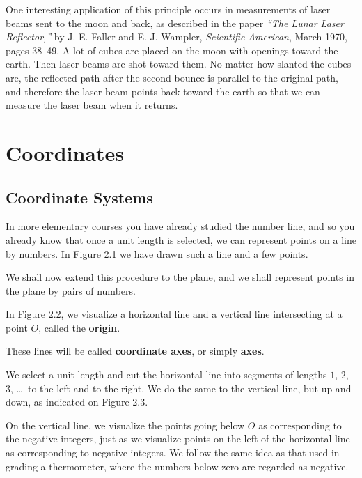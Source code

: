 \documentclass[12pt]{book} %
\begin{document}

One interesting application of this principle occurs in measurements of laser beams sent to the moon and back, as described in the paper \textit{``The Lunar Laser Reflector,''} by J. E. Faller and E. J. Wampler, \textit{Scientific American}, March 1970, pages 38--49. A lot of cubes are placed on the moon with openings toward the earth. Then laser beams are shot toward them. No matter how slanted the cubes are, the reflected path after the second bounce is parallel to the original path, and therefore the laser beam points back toward the earth so that we can measure the laser beam when it returns.

\chapter{Coordinates}

\section{Coordinate Systems}

In more elementary courses you have already studied the number line, and so you already know that once a unit length is selected, we can represent points on a line by numbers. In Figure 2.1 we have drawn such a line and a few points.


We shall now extend this procedure to the plane, and we shall represent points in the plane by pairs of numbers.

In Figure 2.2, we visualize a horizontal line and a vertical line intersecting at a point $O$, called the \textbf{origin}.


These lines will be called \textbf{coordinate axes}, or simply \textbf{axes}.

We select a unit length and cut the horizontal line into segments of lengths $1$, $2$, $3$, \dots\ to the left and to the right. We do the same to the vertical line, but up and down, as indicated on Figure 2.3.


On the vertical line, we visualize the points going below $O$ as corresponding to the negative integers, just as we visualize points on the left of the horizontal line as corresponding to negative integers. We follow the same idea as that used in grading a thermometer, where the numbers below zero are regarded as negative.
\end{document}
